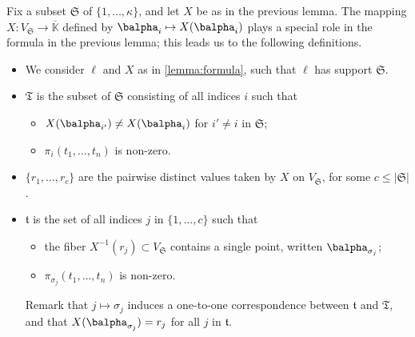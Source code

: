 \documentclass[12pt]{article}
\newcommand{\lf}{X}
\def\dg{\kappa}
\def\Kbar {{\ensuremath{\overline{\mathbb{K}}}}}
\begin{document}
Fix a subset $\mathfrak{S}$ of $\{1,\dots,\dg\}$, and let $\lf$
be as in the previous lemma. The mapping
$\lf:V_\mathfrak{S} \to \Kbar$ defined by $\balpha_i \mapsto
\lf(\balpha_{i})$ plays a special role in the formula in the previous
lemma; this leads us to the following definitions.
\begin{itemize}
\item We consider $\ell$ and $\lf$ as in \cref{lemma:formula}, such
  that $\ell$ has support $\mathfrak{S}$.
\item $\mathfrak{T}$ is the subset of $\mathfrak{S}$ consisting of
  all indices $i$ such that 
  \begin{itemize}
  \item $\lf(\balpha_{i'}) \ne \lf(\balpha_i)$ for $i' \ne i$ in $\mathfrak{S}$;
  \item $\pi_i(t_1,\dots,t_n)$ is non-zero.
  \end{itemize}
\item $\{r_1,\dots,r_c\}$ are the pairwise distinct values taken by $\lf$ on
  $V_\mathfrak{S}$, for some $c \le |\mathfrak{S}|$.
\item $\mathfrak{t}$ is the set of all indices $j$ in
  $\{1,\dots,c\}$ such that
  \begin{itemize}
  \item the fiber $\lf^{-1}(r_j) \subset V_{\mathfrak{S}}$ contains a single
    point, written $\balpha_{\sigma_j}$;
  \item   $\pi_{\sigma_j}(t_1,\dots,t_n)$ is non-zero.
  \end{itemize}
  Remark that $j \mapsto \sigma_j$ induces a one-to-one correspondence
  between  $\mathfrak{t}$ and  $\mathfrak{T}$, and that $\lf(\balpha_{\sigma_j})=r_j$ 
  for all $j$ in $\mathfrak{t}$.
\end{itemize}
\end{document}
